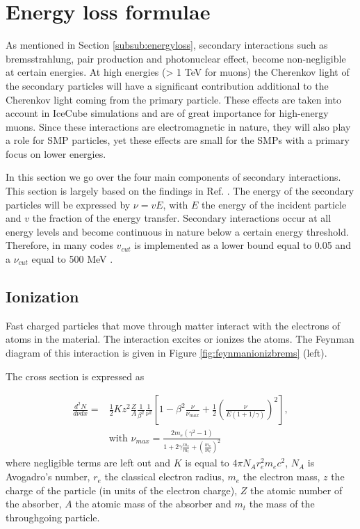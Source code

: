 \section{Energy loss formulae}
\label{sec:energyloss}
As mentioned in Section \ref{subsub:energyloss}, secondary interactions such as bremsstrahlung, pair production and photonuclear effect, become non-negligible at certain energies. At high energies (> 1 TeV for muons) the Cherenkov light of the secondary particles will have a significant contribution additional to the Cherenkov light coming from the primary particle. These effects are taken into account in IceCube simulations and are of great importance for high-energy muons. Since these interactions are electromagnetic in nature, they will also play a role for SMP particles, yet these effects are small for the SMPs with a primary focus on lower energies.

In this section we go over the four main components of secondary interactions. This section is largely based on the findings in Ref. \cite{Chirkin:2004hz}. The energy of the secondary particles will be expressed by $\nu = v E$, with $E$ the energy of the incident particle and $v$ the fraction of the energy transfer. Secondary interactions occur at all energy levels and become continuous in nature below a certain energy threshold. Therefore, in many codes $v_{cut}$ is implemented as a lower bound equal to 0.05 and a $\nu_{cut}$ equal to 500 MeV \cite{dimaspice}. 

\subsection{Ionization}
Fast charged particles that move through matter interact with the electrons of atoms in the material. The interaction excites or ionizes the atoms. The Feynman diagram of this interaction is given in Figure \ref{fig:feynmanionizbrems} (left). 

The cross section is expressed as 

\begin{equation}
\begin{split}
\frac{d^2N}{d\nu dx} = &\frac{1}{2} K z^2 \frac{Z}{A} \frac{1}{\beta^2} \frac{1}{
\nu^2} \left[1-\beta^2 \frac{\nu}{\nu_{max}} + \frac{1}{2} \left(\frac{\nu}{E(1+1/\gamma)} \right)^2 \right],\\
&\textrm{with   } \nu_{max} = \frac{2 m_e (\gamma^2 -1)}{1+2\gamma \frac{m_e}{m_t} +\left(\frac{m_e}{m_t}\right)^2}
\end{split}
\end{equation}
where negligible terms are left out and $K$ is equal to $4\pi N_A r_e^2 m_e c^2$, $N_A$ is Avogadro's number, $r_e$ the classical electron radius, $m_e$ the electron mass, $z$ the charge of the particle (in units of the electron charge), $Z$ the atomic number of the absorber, $A$ the atomic mass of the absorber and $m_t$ the mass of the throughgoing particle.


